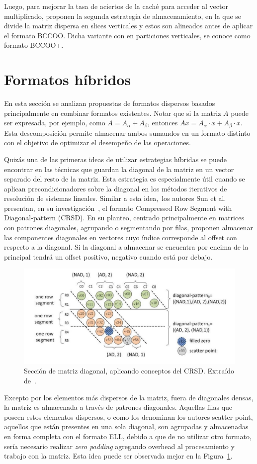 Luego, para mejorar la tasa de aciertos de la caché para acceder al vector multiplicado, proponen la segunda estrategia de almacenamiento, en la que se divide la matriz dispersa en slices verticales y estos son alineados antes de aplicar el formato BCCOO. Dicha variante con en particiones verticales, se conoce como formato BCCOO+.

\section{Formatos híbridos}

En esta sección se analizan propuestas de formatos dispersos basados principalmente en combinar formatos existentes. Notar que si la matriz $A$ puede ser expresada, por ejemplo, como  $A = A_\alpha + A_\beta$, entonces $Ax = A_\alpha \cdot x + A_\beta \cdot x$. Esta descomposición permite almacenar ambos sumandos en un formato distinto con el objetivo de optimizar el desempeño de las operaciones.

Quizás una de las primeras ideas de utilizar estrategias híbridas se puede encontrar en las técnicas que guardan la diagonal de la matriz en un vector separado del resto de la matriz. Esta estrategia es especialmente útil cuando se aplican precondicionadores sobre la diagonal en los métodos iterativos de resolución de sistemas lineales. 
Similar a esta idea,\ los autores Sun et al. presentan, en su investigación~\cite{Sun2011}, el formato Compressed Row Segment with Diagonal-pattern (CRSD). En su planteo, centrado principalmente en matrices con patrones diagonales, agrupando o segmentando por filas, proponen almacenar las componentes diagonales en vectores cuyo índice corresponde al offset con respecto a la diagonal. Si la diagonal a almacenar se encuentra por encima de la principal tendrá un offset positivo, negativo cuando está por debajo. 
\begin{figure}[h]
    \centering
    \includegraphics[width=.8\textwidth]{imagenes/chapter3/crsd.jpg}
    \caption{Sección de matriz diagonal, aplicando conceptos del CRSD. Extraído de~\cite{Sun2011}.}
    \label{fig:CRSD}
\end{figure}
Excepto por los elementos más dispersos de la matriz, fuera de diagonales densas, la matriz es almacenada a través de patrones diagonales. Aquellas filas que poseen estos elementos dispersos, o como los denominan los autores scatter point, aquellos que están presentes en una sola diagonal, son agrupadas y almacenadas en forma completa con el formato ELL, debido a que de no utilizar otro formato, sería necesario realizar \textit{zero padding} agregando overhead al procesamiento y trabajo con la matriz. Esta idea puede ser observada mejor en la Figura~\ref{fig:CRSD}.


